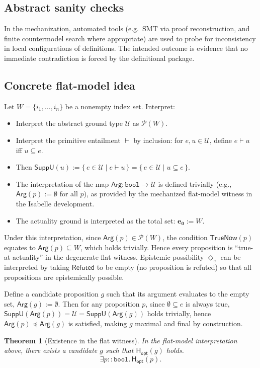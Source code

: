 \documentclass[a4paper, 11pt]{article}
\theoremstyle{plain}
\newtheorem{theorem}{Theorem}[section]
\theoremstyle{definition}
\newcommand{\U}{\mathcal{U}}               %
\newcommand{\SuppU}{\mathsf{SuppU}}       %
\newcommand{\Arg}{\mathsf{Arg}}           %
\newcommand{\TrueNow}{\mathsf{TrueNow}}   %
\newcommand{\Hopt}{\mathsf{H_{opt}}}       %
\newcommand{\Refuted}{\mathsf{Refuted}}   %
\newcommand{\diamondE}{\Diamond_{e}}      %
\newcommand{\eZero}{\mathbf{e_0}}         %
\begin{document}
\subsection{Abstract sanity checks}
In the mechanization, automated tools (e.g.\ SMT via proof reconstruction, and finite countermodel search where appropriate) are used to probe for inconsistency in local configurations of definitions. The intended outcome is evidence that no immediate contradiction is forced by the definitional package.

\subsection{Concrete flat-model idea}
Let $W=\{i_1,\dots,i_n\}$ be a nonempty index set. Interpret:
\begin{itemize}
  \item Interpret the abstract ground type $\U$ as $\mathcal{P}(W)$.
  \item Interpret the primitive entailment $\vdash$ by inclusion: for $e,u\in\U$, define $e \vdash u$ iff $u \subseteq e$.
  \item Then $\SuppU(u) := \{\,e\in\U \mid e \vdash u\,\} = \{\,e\in\U \mid u\subseteq e\,\}$.
  \item The interpretation of the map $\Arg: \texttt{bool} \to \U$ is defined trivially (e.g., $\Arg(p) := \emptyset$ for all $p$), as provided by the mechanized flat-model witness in the Isabelle development.
  \item The actuality ground is interpreted as the total set: $\eZero := W$.
\end{itemize}

\noindent Under this interpretation, since $\Arg(p) \in \mathcal{P}(W)$, the condition $\TrueNow(p)$ equates to $\Arg(p) \subseteq W$, which holds trivially. Hence every proposition is ``true-at-actuality'' in the degenerate flat witness. Epistemic possibility $\diamondE$ can be interpreted by taking $\Refuted$ to be empty (no proposition is refuted) so that all propositions are epistemically possible.

Define a candidate proposition $g$ such that its argument evaluates to the empty set, $\Arg(g) := \emptyset$. Then for any proposition $p$, since $\emptyset \subseteq e$ is always true, $\SuppU(\Arg(p)) = \U = \SuppU(\Arg(g))$ holds trivially, hence $\Arg(p) \preceq \Arg(g)$ is satisfied, making $g$ maximal and final by construction.

\begin{theorem}[Existence in the flat witness]
\label{thm:flat_ex}
In the flat-model interpretation above, there exists a candidate $g$ such that $\Hopt(g)$ holds.
\[
\exists p::\texttt{bool}.\, \Hopt(p).
\]
\end{theorem}
\end{document}
